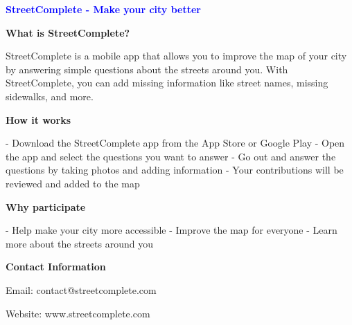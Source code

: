 \documentclass[11pt]{article}
\begin{document}
\begin{center}


\vspace{1cm}

{\Large\textbf{\textcolor{blue}{StreetComplete - Make your city better}}}

\vspace{0.5cm}

{\large\textbf{What is StreetComplete?}}

\vspace{0.5cm}

StreetComplete is a mobile app that allows you to improve the map of your city by answering simple questions about the streets around you. With StreetComplete, you can add missing information like street names, missing sidewalks, and more.

\vspace{1cm}

{\large\textbf{How it works}}

\vspace{0.5cm}

- Download the StreetComplete app from the App Store or Google Play
- Open the app and select the questions you want to answer
- Go out and answer the questions by taking photos and adding information
- Your contributions will be reviewed and added to the map

\vspace{1cm}

{\large\textbf{Why participate}}

\vspace{0.5cm}

- Help make your city more accessible
- Improve the map for everyone
- Learn more about the streets around you

\vspace{1cm}

{\large\textbf{Contact Information}}

\vspace{0.5cm}

Email: contact@streetcomplete.com

Website: www.streetcomplete.com

\end{center}
\end{document}
